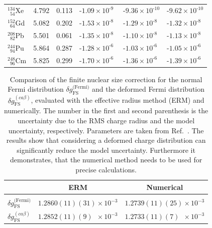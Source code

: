 \begin{table}
\begin{tabular}{l|ccccc}
$^{134}_{\phantom{0}54}$Xe           & 4.792 & 0.113 & ${\text{-}}{1.09}{\scriptstyle\times}{10^{\text{-}9\phantom{0}}}$ &${\text{-}}{9.36}{\scriptstyle\times}{10^{\text{-}10}}$&${\text{-}}{9.62}{\scriptstyle\times}{10^{\text{-}10}}$\\[4pt]
$^{152}_{\phantom{0}64}$Gd           & 5.082 & 0.202 & ${\text{-}}{1.53}{\scriptstyle\times}{10^{\text{-}8\phantom{0}}}$ &${\text{-}}{1.29}{\scriptstyle\times}{10^{\text{-}8\phantom{0}}}$&${\text{-}}{1.32}{\scriptstyle\times}{10^{\text{-}8\phantom{0}}}$\\[4pt]
$^{208}_{\phantom{0}82}$Pb           & 5.501 & 0.061 & ${\text{-}}{1.35}{\scriptstyle\times}{10^{\text{-}8\phantom{0}}}$ &${\text{-}}{1.10}{\scriptstyle\times}{10^{\text{-}8\phantom{0}}}$&${\text{-}}{1.13}{\scriptstyle\times}{10^{\text{-}8\phantom{0}}}$\\[4pt]
$^{244}_{\phantom{0}94}$Pu           & 5.864 & 0.287 & ${\text{-}}{1.28}{\scriptstyle\times}{10^{\text{-}6\phantom{0}}}$ &${\text{-}}{1.03}{\scriptstyle\times}{10^{\text{-}6\phantom{0}}}$&${\text{-}}{1.05}{\scriptstyle\times}{10^{\text{-}6\phantom{0}}}$\\[4pt]
$^{248}_{\phantom{0}96}$Cm           & 5.825 & 0.299 & ${\text{-}}{1.70}{\scriptstyle\times}{10^{\text{-}6\phantom{0}}}$ &${\text{-}}{1.36}{\scriptstyle\times}{10^{\text{-}6\phantom{0}}}$&${\text{-}}{1.39}{\scriptstyle\times}{10^{\text{-}6\phantom{0}}}$\\[4pt]
\end{tabular}
\end{table}%
%
\begin{table}[b]
\caption{\label{tab:uranium}%
Comparison of the finite nuclear size correction for the normal Fermi distribution $\delta g_{\text{FS}}^{\text{(Fermi)}}$ and the deformed Fermi distribution $\delta g^{(ca\beta)}_{\text{FS}}$, evaluated with the effective radius method (ERM) and numerically. The number in the first and second parenthesis is the uncertainty due to the RMS charge radius and the model uncertainty, respectively. Parameters are taken from Ref.~\cite{kozhedub2008}. The results show that considering a deformed charge distribution can significantly reduce the model uncertainty. Furthermore it demonstrates, that the numerical method needs to be used for precise calculations.
}
\centering
\begin{tabular}{l|cc}
&ERM&Numerical\\\hline\\
$\delta g_{\text{FS}}^{\text{(Fermi)}}$&$1.2860(11)(31)\times 10^{-3}$&$1.2739(11)(25)\times 10^{-3}$\\[0.4cm]
$\delta g^{(ca\beta)}_{\text{FS}}$&$1.2852(11)(9)\phantom{0}\times 10^{-3}$&$1.2733(11)(7)\phantom{0}\times 10^{-3}$
\end{tabular}
\end{table}

